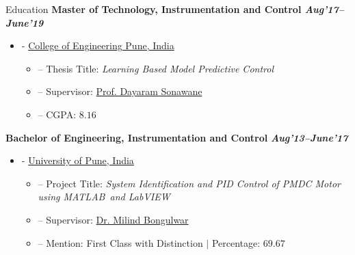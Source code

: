 \documentclass[11pt]{resume}
\newcommand{\mt}{\textsc{MATLAB}}
\newenvironment{outerlist}[1][\enskip\textbullet]%
{\begin{itemize}[#1,leftmargin=*]}{\end{itemize}%
	\vspace{-.5\baselineskip}}
\newenvironment{innerlist}[1][\enskip\textbullet]%
{\begin{itemize}[#1,leftmargin=*,parsep=0pt,itemsep=0pt,topsep=0pt,partopsep=0pt]}
	{\end{itemize}}
\begin{document}
\begin{rSection}{Education}
{\bf{Master of Technology, Instrumentation and Control} \hfill {\textit{Aug'17--June'19}}}
\begin{outerlist}
	\item[-]  \href{http://www.coep.org.in/} {College of Engineering Pune, India}
	\begin{innerlist}
		\item[--] Thesis Title: \textit{Learning Based Model Predictive Control}
		\item[--] Supervisor: \href{http://www.coep.org.in/mycoep/dnsinstrucoepacin} {Prof. Dayaram Sonawane}
		\item[--] CGPA: $ 8.16 $
	\end{innerlist}
\end{outerlist}
\vspace{.1in}
\textbf{{Bachelor of Engineering, Instrumentation and Control}} \hfill \textit{\textbf{Aug'13--June'17}}
\begin{outerlist}
	\item[-]  \href{http://www.unipune.ac.in/} {University of Pune, India}	
	\begin{innerlist}
		\item[--] Project Title: \textit{System Identification and PID Control of PMDC Motor using \mt~and LabVIEW}
		\item[--] Supervisor: \href{http://www.gcoeara.ac.in/Instrumentation-control-about-us.php} {Dr. Milind Bongulwar}
		\item[--] Mention:  First Class with Distinction $ \vert $ Percentage: $69.67$
	\end{innerlist}
\end{outerlist}
\end{rSection}
\vspace{5mm}
\end{document}
